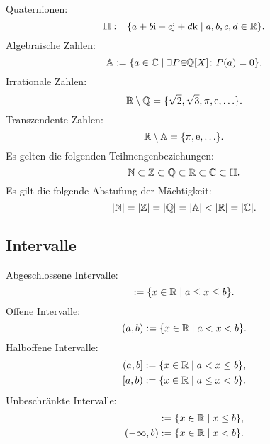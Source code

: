 Quaternionen:
\begin{equation}
\mathbb H := \{a+b\mathrm i+c\mathrm j+d\mathrm k\mid a,b,c,d\in\mathbb R\}.
\end{equation}
Algebraische Zahlen:
\begin{equation}
\mathbb A := \{a\in\mathbb C\mid \exists P{\in}\mathbb Q[X]\colon P(a)=0\}.
\end{equation}
Irrationale Zahlen:
\begin{equation}
\mathbb R\setminus\mathbb Q = \{\sqrt{2},\sqrt{3},\pi,\mathrm e,\ldots\}.
\end{equation}
Transzendente Zahlen:
\begin{equation}
\mathbb R\setminus\mathbb A = \{\pi,\mathrm e,\ldots\}.
\end{equation}
Es gelten die folgenden Teilmengenbeziehungen:
\begin{equation}
\mathbb N\subset\mathbb Z\subset\mathbb Q\subset\mathbb R\subset\mathbb C\subset\mathbb H.
\end{equation}
Es gilt die folgende Abstufung der Mächtigkeit:
\begin{equation}
|\mathbb N| = |\mathbb Z| = |\mathbb Q| = |\mathbb A| < |\mathbb R| = |\mathbb C|.
\end{equation}

\newpage
\subsection{Intervalle}
Abgeschlossene Intervalle:
\begin{equation}
[a,b] := \{x\in\R\mid a\le x\le b\}.
\end{equation}
Offene Intervalle:
\begin{equation}
(a,b) := \{x\in\mathbb R\mid a<x<b\}.
\end{equation}
Halboffene Intervalle:
\begin{align}
(a,b] &:= \{x\in\mathbb R\mid a<x\le b\},\\
[a,b) &:= \{x\in\mathbb R\mid a\le x<b\}.
\end{align}
Unbeschränkte Intervalle:
\begin{align}
[a,\infty) &:= \{x\in\R\mid a\le x\},\\
(a,\infty) &:= \{x\in\R\mid a<x\},\\
(-\infty,b] &:= \{x\in\R\mid x\le b\},\\
(-\infty,b) &:= \{x\in\R\mid x<b\}.
\end{align}

